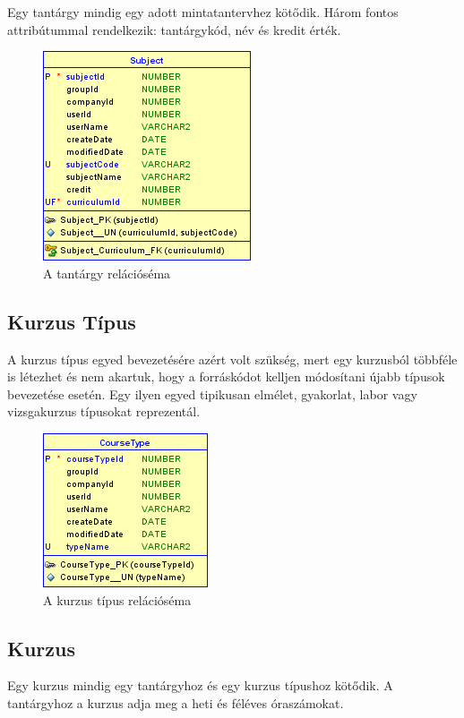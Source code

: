 \documentclass[hidelinks, 12pt, a4paper]{report}
\begin{document}
Egy tantárgy mindig egy adott mintatantervhez kötődik. Három fontos attribútummal rendelkezik: tantárgykód, név és kredit érték.

\begin{figure}[H]
    \centering
	\includegraphics{subject.png}
	\caption{A tantárgy relációséma}
\end{figure}

\subsection{Kurzus Típus}

A kurzus típus egyed bevezetésére azért volt szükség, mert egy kurzusból többféle is létezhet és nem akartuk, hogy a forráskódot kelljen módosítani újabb típusok bevezetése esetén. Egy ilyen egyed tipikusan elmélet, gyakorlat, labor vagy vizsgakurzus típusokat reprezentál.

\begin{figure}[H]
    \centering
	\includegraphics{course_type.png}
	\caption{A kurzus típus relációséma}
\end{figure}

\subsection{Kurzus}

Egy kurzus mindig egy tantárgyhoz és egy kurzus típushoz kötődik. A tantárgyhoz a kurzus adja meg a heti és féléves óraszámokat.
\end{document}
